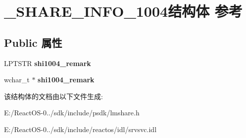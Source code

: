 \hypertarget{struct___s_h_a_r_e___i_n_f_o__1004}{}\section{\+\_\+\+S\+H\+A\+R\+E\+\_\+\+I\+N\+F\+O\+\_\+1004结构体 参考}
\label{struct___s_h_a_r_e___i_n_f_o__1004}
\subsection*{Public 属性}
\begin{DoxyCompactItemize}
\item 
\mbox{\label{struct___s_h_a_r_e___i_n_f_o__1004_a66212238adfe2c8b2adad35b5d5d1b81}} 
L\+P\+T\+S\+TR {\bfseries shi1004\+\_\+remark}
\item 
\mbox{\label{struct___s_h_a_r_e___i_n_f_o__1004_a15bb3226ac503e511ac0902aae34ef42}} 
wchar\+\_\+t $\ast$ {\bfseries shi1004\+\_\+remark}
\end{DoxyCompactItemize}


该结构体的文档由以下文件生成\+:\begin{DoxyCompactItemize}
\item 
E\+:/\+React\+O\+S-\/0../sdk/include/psdk/lmshare.\+h\item 
E\+:/\+React\+O\+S-\/0../sdk/include/reactos/idl/srvsvc.\+idl\end{DoxyCompactItemize}
